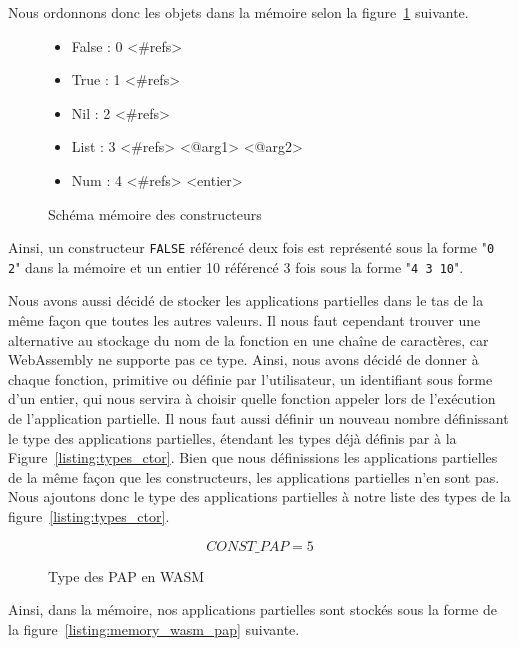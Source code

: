 \documentclass{rapportECL}
\begin{document}
Nous ordonnons donc les objets dans la mémoire selon la figure~\ref{listing:memory_wasm} suivante.

\begin{figure}[H]
	\begin{itemize}
		\item False : 0 <\#refs>
		\item True  : 1 <\#refs>
		\item Nil   : 2 <\#refs>
		\item List  : 3 <\#refs> <@arg1> <@arg2>
		\item Num   : 4 <\#refs> <entier>
	\end{itemize}
	\caption{Schéma mémoire des constructeurs}
	\label{listing:memory_wasm}
\end{figure}

Ainsi, un constructeur \verb|FALSE| référencé deux fois est représenté sous la forme "\verb|0 2|" dans la mémoire et un entier 10 
référencé 3 fois sous la forme "\verb|4 3 10|".

\bigskip

Nous avons aussi décidé de stocker les applications partielles dans le tas de la même façon que toutes les autres valeurs.
Il nous faut cependant trouver une alternative au stockage du nom de la fonction en une chaîne de caractères, car WebAssembly
ne supporte pas ce type. Ainsi, nous avons décidé de donner à chaque fonction, primitive ou définie par l'utilisateur, un identifiant
sous forme d'un entier, qui nous servira à choisir quelle fonction appeler lors de l'exécution de l'application partielle.
Il nous faut aussi définir un nouveau nombre définissant le type des applications partielles, étendant les types déjà définis
par à la Figure~\ref{listing:types_ctor}. Bien que nous définissions les applications partielles de la même façon que les constructeurs,
les applications partielles n'en sont pas. 
Nous ajoutons donc le type des applications partielles à notre liste des types de la figure~\ref{listing:types_ctor}.


\begin{figure}[H]
	\begin{equation*}
	CONST\_PAP = 5
	\end{equation*}
	\caption{Type des PAP en WASM}
	\label{listing:types_pap_wasm}
	\end{figure}
	\FloatBarrier 

Ainsi, dans la mémoire, nos applications partielles sont stockés sous la forme de la figure~\ref{listing:memory_wasm_pap} suivante.
\end{document}

